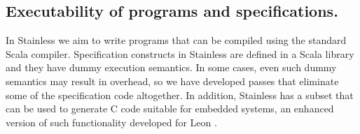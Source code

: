 \subsection{Executability of programs and specifications.} In Stainless we aim to write programs
that can be compiled using the standard Scala compiler. Specification constructs
in Stainless are defined in a Scala library and they have dummy execution semantics.
In some cases, even such dummy semantics may result in overhead, so we have developed passes
that eliminate some of the specification code altogether.
In addition, Stainless has a subset that can be used to generate C code suitable for embedded
systems, an enhanced version of such functionality developed for Leon \cite{antognini17genc}.

